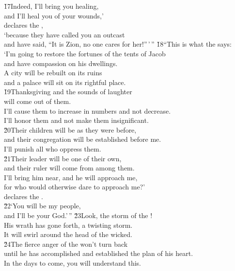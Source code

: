 \begin{poetry}
\poeml \v{17}Indeed, I'll bring you healing, \\
\poemll    and I'll heal you of your wounds,' \\
\poemlll       declares the , \\
\poeml `because they have called you an outcast \\
\poemll    and have said, ``It is Zion, no one cares for her!''\,'\,''
\poeml \v{18}``This is what the  says: \\
\poeml `I'm going to restore the fortunes of the tents of Jacob \\
\poemll    and have compassion on his dwellings. \\
\poeml A city will be rebuilt on its ruins \\
\poemll    and a palace will sit on its rightful place. \\
\poeml \v{19}Thanksgiving and the sounds of laughter \\
\poemll    will come out of them. \\
\poeml I'll cause them to increase in numbers and not decrease. \\
\poemll    I'll honor them and not make them insignificant. \\
\poeml \v{20}Their children will be as they were before, \\
\poemll    and their congregation will be established before me. \\
\poeml I'll punish all who oppress them. \\
\poeml \v{21}Their leader will be one of their own, \\
\poemll    and their ruler will come from among them. \\
\poeml I'll bring him near, and he will approach me, \\
\poemll    for who would otherwise dare to approach me?' \\
\poemlll       declares the . \\
\poeml \v{22}`You will be my people, \\
\poemll    and I'll be your God.'\,''
\poeml \v{23}Look, the storm of the ! \\
\poemll    His wrath has gone forth, a twisting storm. \\
\poemlll       It will swirl around the head of the wicked. \\
\poeml \v{24}The fierce anger of the  won't turn back \\
\poemll    until he has accomplished and established the plan of his heart. \\
\poeml In the days to come, you will understand this.
\end{poetry}

